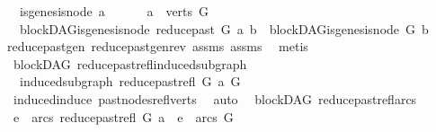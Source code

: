 \begin{isabellebody}
\ \ \ {\isachardoublequoteopen}{\isasymnot}is{\isacharunderscore}{\kern0pt}genesis{\isacharunderscore}{\kern0pt}node\ a{\isachardoublequoteclose}\ \isanewline
\ \ \ \ \ {\isachardoublequoteopen}a\ {\isasymin}\ verts\ G{\isachardoublequoteclose}\isanewline
\ \ \ {\isachardoublequoteopen}blockDAG{\isachardot}{\kern0pt}is{\isacharunderscore}{\kern0pt}genesis{\isacharunderscore}{\kern0pt}node\ {\isacharparenleft}{\kern0pt}reduce{\isacharunderscore}{\kern0pt}past\ G\ a{\isacharparenright}{\kern0pt}\ b\ {\isacharequal}{\kern0pt}\ blockDAG{\isachardot}{\kern0pt}is{\isacharunderscore}{\kern0pt}genesis{\isacharunderscore}{\kern0pt}node\ G\ b{\isachardoublequoteclose}\isanewline
%
\isadelimproof
\ \ %
\endisadelimproof
%
\isatagproof
{}\isamarkupfalse%
\ reduce{\isacharunderscore}{\kern0pt}past{\isacharunderscore}{\kern0pt}gen\ reduce{\isacharunderscore}{\kern0pt}past{\isacharunderscore}{\kern0pt}gen{\isacharunderscore}{\kern0pt}rev\ assms\ assms\ \isamarkupfalse%
\ metis%
\endisatagproof
{\isafoldproof}%
%
\isadelimproof
%
\endisadelimproof
%
\isadelimdocument
%
\endisadelimdocument
%
\isatagdocument
%
\isamarkuptrue%
%
\endisatagdocument
{\isafolddocument}%
%
\isadelimdocument
%
\endisadelimdocument
{}\isamarkupfalse%
\ {\isacharparenleft}{\kern0pt}\ blockDAG{\isacharparenright}{\kern0pt}\ reduce{\isacharunderscore}{\kern0pt}past{\isacharunderscore}{\kern0pt}refl{\isacharunderscore}{\kern0pt}induced{\isacharunderscore}{\kern0pt}subgraph{\isacharcolon}{\kern0pt}\isanewline
\ \ \ {\isachardoublequoteopen}induced{\isacharunderscore}{\kern0pt}subgraph\ {\isacharparenleft}{\kern0pt}reduce{\isacharunderscore}{\kern0pt}past{\isacharunderscore}{\kern0pt}refl\ G\ a{\isacharparenright}{\kern0pt}\ G{\isachardoublequoteclose}\isanewline
%
\isadelimproof
\ \ %
\endisadelimproof
%
\isatagproof
{}\isamarkupfalse%
\ \ induced{\isacharunderscore}{\kern0pt}induce\ past{\isacharunderscore}{\kern0pt}nodes{\isacharunderscore}{\kern0pt}refl{\isacharunderscore}{\kern0pt}verts\ \isamarkupfalse%
\ auto%
\endisatagproof
{\isafoldproof}%
%
\isadelimproof
\isanewline
%
\endisadelimproof
\isanewline
{}\isamarkupfalse%
\ {\isacharparenleft}{\kern0pt}\ blockDAG{\isacharparenright}{\kern0pt}\ reduce{\isacharunderscore}{\kern0pt}past{\isacharunderscore}{\kern0pt}refl{\isacharunderscore}{\kern0pt}arcs{}{\isacharcolon}{\kern0pt}\isanewline
\ \ {\isachardoublequoteopen}e\ {\isasymin}\ arcs\ {\isacharparenleft}{\kern0pt}reduce{\isacharunderscore}{\kern0pt}past{\isacharunderscore}{\kern0pt}refl\ G\ a{\isacharparenright}{\kern0pt}\ {\isasymLongrightarrow}\ e\ {\isasymin}\ arcs\ G{\isachardoublequoteclose}\isanewline

\end{isabellebody}
